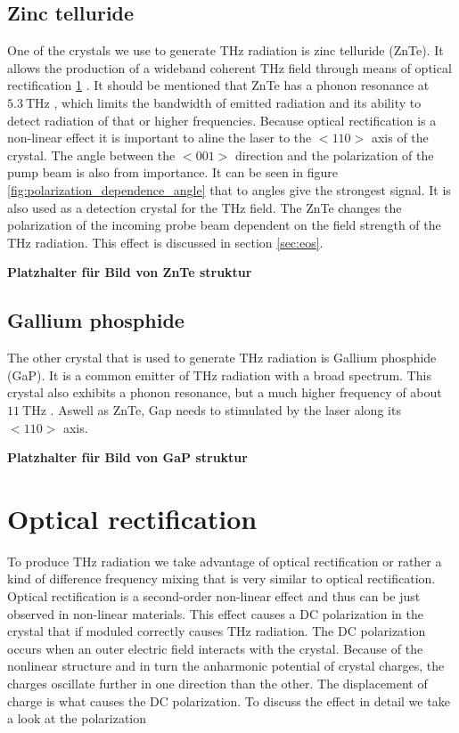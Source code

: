 \subsection{Zinc telluride}
One of the crystals we use to generate $\si{\tera\hertz}$ radiation is zinc telluride (ZnTe). 
It allows the production of a wideband coherent $\si{\tera\hertz}$ field through means of optical rectification \ref{sec:optic_ref} \cite{ZnTe_Nahata_Weling_1996}.
It should be mentioned that ZnTe has a phonon resonance at $\SI{5.3}{\tera\hertz}$ \cite{phonon_modes}, which limits the bandwidth of emitted radiation and its ability to detect radiation of that or higher frequencies.
Because optical rectification is a non-linear effect it is important to aline the laser to the $<110>$ axis of the crystal.
The angle between the $<001>$ direction and the polarization of the pump beam is also from importance.
It can be seen in figure \ref{fig:polarization_dependence_angle} that to angles give the strongest signal.
It is also used as a detection crystal for the $\si{\tera\hertz}$ field.
The ZnTe changes the polarization of the incoming probe beam dependent on the field strength of the $\si{\tera\hertz}$ radiation.
This effect is discussed in section \ref{sec:eos}.

\textbf{Platzhalter für Bild von ZnTe struktur}

\subsection{Gallium phosphide}
The other crystal that is used to generate $\si{\tera\hertz}$ radiation is Gallium phosphide (GaP).
It is a common emitter of $\si{\tera\hertz}$ radiation with a broad spectrum.
This crystal also exhibits a phonon resonance, but a much higher frequency of about $\SI{11}{\tera\hertz}$ \cite[60]{wiki_book}.
Aswell as ZnTe, Gap needs to stimulated by the laser along its $<110>$ axis.

\textbf{Platzhalter für Bild von GaP struktur}


\section{Optical rectification}\label{sec:optic_ref}
To produce $\si{\tera\hertz}$ radiation we take advantage of optical rectification or rather a kind of difference frequency mixing that is very similar to optical rectification.
Optical rectification is a second-order non-linear effect and thus can be just observed in non-linear materials.
This effect causes a DC polarization in the crystal that if moduled correctly causes $\si{\tera\hertz}$ radiation.
The DC polarization occurs when an outer electric field interacts with the crystal.
Because of the nonlinear structure and in turn the anharmonic potential of crystal charges, the charges oscillate further in one direction than the other.
The displacement of charge is what causes the DC polarization.
To discuss the effect in detail we take a look at the polarization

